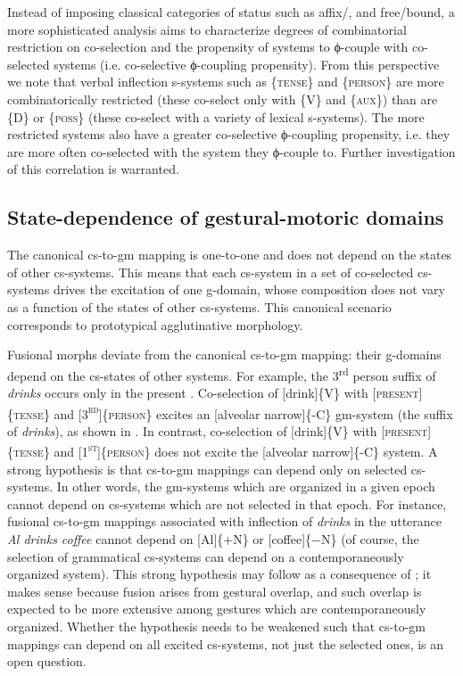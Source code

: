  Instead of imposing classical categories of  status such as affix/, and free/bound, a more sophisticated analysis aims to characterize degrees of combinatorial restriction on co-selection and the propensity of systems to ϕ-couple with co-selected systems (i.e. co-selective ϕ-coupling propensity). From this perspective we note that verbal inflection s-systems such as \{\textsc{tense}\} and \{\textsc{person}\} are more combinatorically restricted (these co-select only with \{V\} and \{\textsc{aux}\}) than are \{D\} or \{\textsc{poss}\} (these co-select with a variety of lexical s-systems). The more restricted systems also have a greater co-selective ϕ-coupling propensity, i.e. they are more often co-selected with the system they ϕ-couple to. Further investigation of this correlation is warranted.

\subsection{State-dependence of gestural-motoric domains}

The canonical cs-to-gm mapping is one-to-one and does not depend on the states of other cs-systems. This means that each cs-system in a set of co-selected cs-systems drives the excitation of one g-domain, whose composition does not vary as a function of the states of other cs-systems. This canonical scenario corresponds to prototypical agglutinative morphology. 

  Fusional morphs deviate from the canonical cs-to-gm mapping: their g-do\-mains depend on the cs-states of other systems. For example, the 3\textsuperscript{rd} person suffix of \textit{drinks} occurs only in the present . Co-selection of [drink]\{V\} with [\textsc{present}]\{\textsc{tense}\} and [\textsc{3}\textsc{\textsuperscript{rd}}]\{\textsc{person}\} excites an [alveolar narrow]\{-C\} gm-sys\-tem (the suffix of \textit{drinks}), as shown in {}. In contrast, co-selection of [drink]\linebreak\relax\{V\} with [\textsc{present]}\{\textsc{tense}\} and [\textsc{1}\textsc{\textsuperscript{st}}]\{\textsc{person}\} does not excite the [alveolar narrow]\linebreak\relax\{-C\} system. A strong hypothesis is that cs-to-gm mappings can depend only on selected cs-systems. In other words, the gm-sys\-tems which are organized in a given epoch cannot depend on cs-systems which are not selected in that epoch. For instance, fusional cs-to-gm mappings associated with inflection of \textit{drinks} in the utterance \textit{Al drinks coffee} cannot depend on [Al]\{+N\} or [coffee]\{−N\} (of course, the selection of grammatical cs-systems can depend on a contemporaneously organized system). This strong hypothesis may follow as a consequence of ; it makes sense because fusion arises from gestural overlap, and such overlap is expected to be more extensive among gestures which are contemporaneously organized. Whether the hypothesis needs to be weakened such that cs-to-gm mappings can depend on all excited cs-systems, not just the selected ones, is an open question.

